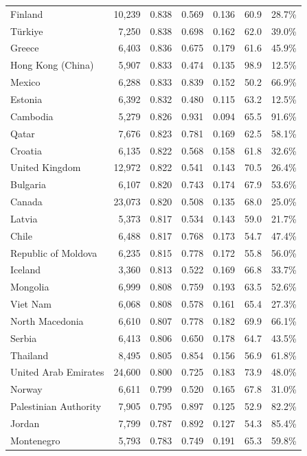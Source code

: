 \begin{table}[!t]
\begin{tabular}{@{}lrrrrrr@{}}
Finland & 10,239 & 0.838 & 0.569 & 0.136 & 60.9 & 28.7\% \\
Türkiye & 7,250 & 0.838 & 0.698 & 0.162 & 62.0 & 39.0\% \\
Greece & 6,403 & 0.836 & 0.675 & 0.179 & 61.6 & 45.9\% \\
Hong Kong (China) & 5,907 & 0.833 & 0.474 & 0.135 & 98.9 & 12.5\% \\
Mexico & 6,288 & 0.833 & 0.839 & 0.152 & 50.2 & 66.9\% \\
Estonia & 6,392 & 0.832 & 0.480 & 0.115 & 63.2 & 12.5\% \\
Cambodia & 5,279 & 0.826 & 0.931 & 0.094 & 65.5 & 91.6\% \\
Qatar & 7,676 & 0.823 & 0.781 & 0.169 & 62.5 & 58.1\% \\
Croatia & 6,135 & 0.822 & 0.568 & 0.158 & 61.8 & 32.6\% \\
United Kingdom & 12,972 & 0.822 & 0.541 & 0.143 & 70.5 & 26.4\% \\
Bulgaria & 6,107 & 0.820 & 0.743 & 0.174 & 67.9 & 53.6\% \\
Canada & 23,073 & 0.820 & 0.508 & 0.135 & 68.0 & 25.0\% \\
Latvia & 5,373 & 0.817 & 0.534 & 0.143 & 59.0 & 21.7\% \\
Chile & 6,488 & 0.817 & 0.768 & 0.173 & 54.7 & 47.4\% \\
Republic of Moldova & 6,235 & 0.815 & 0.778 & 0.172 & 55.8 & 56.0\% \\
Iceland & 3,360 & 0.813 & 0.522 & 0.169 & 66.8 & 33.7\% \\
Mongolia & 6,999 & 0.808 & 0.759 & 0.193 & 63.5 & 52.6\% \\
Viet Nam & 6,068 & 0.808 & 0.578 & 0.161 & 65.4 & 27.3\% \\
North Macedonia & 6,610 & 0.807 & 0.778 & 0.182 & 69.9 & 66.1\% \\
Serbia & 6,413 & 0.806 & 0.650 & 0.178 & 64.7 & 43.5\% \\
Thailand & 8,495 & 0.805 & 0.854 & 0.156 & 56.9 & 61.8\% \\
United Arab Emirates & 24,600 & 0.800 & 0.725 & 0.183 & 73.9 & 48.0\% \\
Norway & 6,611 & 0.799 & 0.520 & 0.165 & 67.8 & 31.0\% \\
Palestinian Authority & 7,905 & 0.795 & 0.897 & 0.125 & 52.9 & 82.2\% \\
Jordan & 7,799 & 0.787 & 0.892 & 0.127 & 54.3 & 85.4\% \\
Montenegro & 5,793 & 0.783 & 0.749 & 0.191 & 65.3 & 59.8\% \\

\end{tabular}
\end{table}
